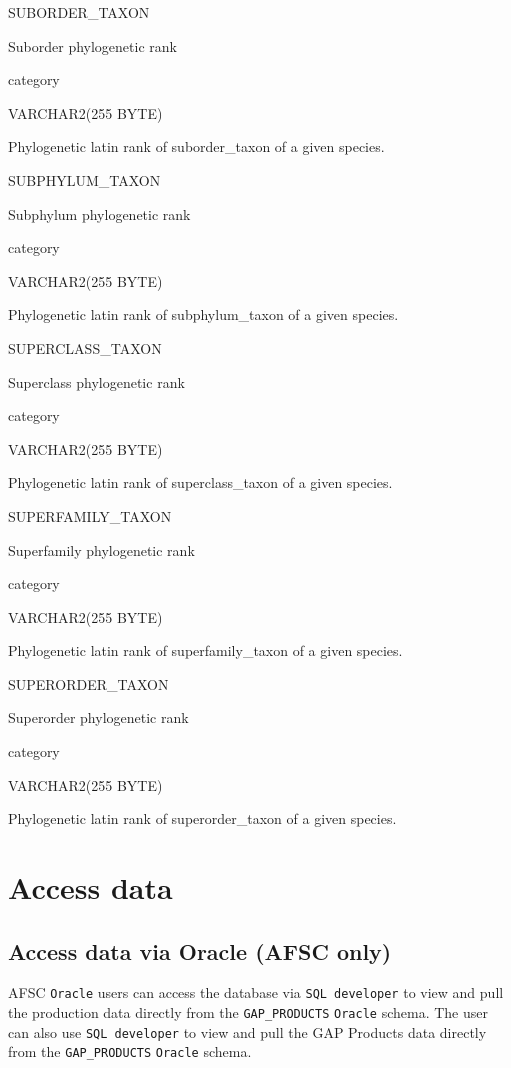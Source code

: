 \documentclass[
  letterpaper,
  oneside,
  open=any]{scrbook}
\begin{document}
SUBORDER\_TAXON

Suborder phylogenetic rank

category

VARCHAR2(255 BYTE)

Phylogenetic latin rank of suborder\_taxon of a given species.

SUBPHYLUM\_TAXON

Subphylum phylogenetic rank

category

VARCHAR2(255 BYTE)

Phylogenetic latin rank of subphylum\_taxon of a given species.

SUPERCLASS\_TAXON

Superclass phylogenetic rank

category

VARCHAR2(255 BYTE)

Phylogenetic latin rank of superclass\_taxon of a given species.

SUPERFAMILY\_TAXON

Superfamily phylogenetic rank

category

VARCHAR2(255 BYTE)

Phylogenetic latin rank of superfamily\_taxon of a given species.

SUPERORDER\_TAXON

Superorder phylogenetic rank

category

VARCHAR2(255 BYTE)

Phylogenetic latin rank of superorder\_taxon of a given species.

\hypertarget{access-data}{%
\chapter{Access data}\label{access-data}}

\hypertarget{access-data-via-oracle-afsc-only}{%
\section{Access data via Oracle (AFSC
only)}\label{access-data-via-oracle-afsc-only}}

AFSC \texttt{Oracle} users can access the database via
\texttt{SQL\ developer} to view and pull the production data directly
from the \texttt{GAP\_PRODUCTS} \texttt{Oracle} schema. The user can
also use \texttt{SQL\ developer} to view and pull the GAP Products data
directly from the \texttt{GAP\_PRODUCTS} \texttt{Oracle} schema.
\end{document}

